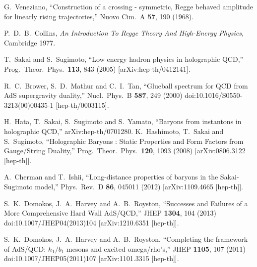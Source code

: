 \documentclass[aps, prd, preprintnumbers, floatfix, showpacs, showkeys, nofootinbib, 10pt]{revtex4-1}
\begin{document}
\begin{references}


  G.~Veneziano,
  ``Construction of a crossing - symmetric, Regge behaved amplitude for
  linearly rising trajectories,''
  Nuovo Cim.\  A {\bf 57}, 190 (1968).

 P.~D.~B.~Collins,
 {\it An Introduction To Regge Theory And High-Energy Physics,}
Cambridge 1977.


 T.~Sakai and S.~Sugimoto,
  ``Low energy hadron physics in holographic QCD,''
  Prog.\ Theor.\ Phys.\  {\bf 113}, 843 (2005)
  [arXiv:hep-th/0412141].

  R.~C.~Brower, S.~D.~Mathur and C.~I.~Tan,
  ``Glueball spectrum for QCD from AdS supergravity duality,''
  Nucl.\ Phys.\ B {\bf 587}, 249 (2000)
  doi:10.1016/S0550-3213(00)00435-1
  [hep-th/0003115].

  H.~Hata, T.~Sakai, S.~Sugimoto and S.~Yamato,
  ``Baryons from instantons in holographic QCD,''
  arXiv:hep-th/0701280.
  K.~Hashimoto, T.~Sakai and S.~Sugimoto,
  ``Holographic Baryons : Static Properties and Form Factors from Gauge/String
  Duality,''
  Prog.\ Theor.\ Phys.\  {\bf 120}, 1093 (2008)
  [arXiv:0806.3122 [hep-th]].

  A.~Cherman and T.~Ishii,
  ``Long-distance properties of baryons in the Sakai-Sugimoto model,''
  Phys.\ Rev.\ D {\bf 86}, 045011 (2012)
  [arXiv:1109.4665 [hep-th]].

  S.~K.~Domokos, J.~A.~Harvey and A.~B.~Royston,
  ``Successes and Failures of a More Comprehensive Hard Wall AdS/QCD,''
  JHEP {\bf 1304}, 104 (2013)
  doi:10.1007/JHEP04(2013)104
  [arXiv:1210.6351 [hep-th]].

 S.~K.~Domokos, J.~A.~Harvey and A.~B.~Royston,
  ``Completing the framework of AdS/QCD: $h_1/b_1$ mesons and excited omega/rho's,''
  JHEP {\bf 1105}, 107 (2011)
  doi:10.1007/JHEP05(2011)107
  [arXiv:1101.3315 [hep-th]].


\end{references}
\end{document}
